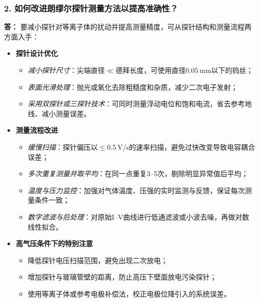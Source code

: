 \documentclass[12pt,a4paper,UTF8]{ctexart}
\begin{document}
\subsubsection*{2. 如何改进朗缪尔探针测量方法以提高准确性？}
\textbf{答：}  
要减小探针对等离子体的扰动并提高测量精度，可从探针结构和测量流程两方面入手：
\begin{itemize}
  \item \textbf{探针设计优化}
  \begin{itemize}
    \item \emph{减小探针尺寸}：尖端直径$\ll$德拜长度，可使用直径0.05 mm以下的钨丝；  
    \item \emph{表面光滑处理}：抛光或氧化去除粗糙度和杂质，减少二次电子发射；  
    \item \emph{采用双探针或三探针技术}：可同时测量浮动电位和饱和电流，省去参考地线、减小测量误差。
  \end{itemize}
  \item \textbf{测量流程改进}
  \begin{itemize}
    \item \emph{缓慢扫描}：探针偏压以$\le$0.5 V/s的速率扫描，避免过快改变导致电容耦合误差；  
    \item \emph{多次重复测量并取平均}：在同一点重复3–5次，剔除明显异常值后平均；  
    \item \emph{温度与压力监控}：加强对气体温度、压强的实时监测与反馈，保证每次测量条件一致；  
    \item \emph{数字滤波与后处理}：对原始I–V曲线进行低通滤波或小波去噪，再做对数线性拟合。
  \end{itemize}
  \item \textbf{高气压条件下的特别注意}
  \begin{itemize}
    \item 降低探针电压扫描范围，避免出现二次放电；  
    \item 增加探针与玻璃管壁的距离，防止高压下壁面放电污染探针；  
    \item 使用等离子体或参考电极补偿法，校正电极位降引入的系统误差。
  \end{itemize}
\end{itemize}
\end{document}
